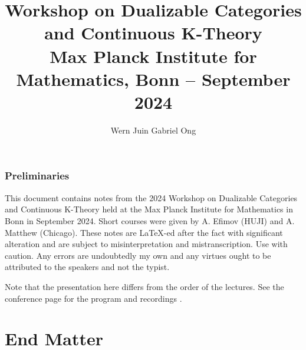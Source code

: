 \documentclass{amsart}
\theoremstyle{definition}
\numberwithin{equation}{section}
\begin{document}
\large
\title[Dualizable Categories and Continuous K-Theory -- MPIM 2024]{Workshop on Dualizable Categories and Continuous K-Theory \\ Max Planck Institute for Mathematics, Bonn -- September 2024}
\author{Wern Juin Gabriel Ong}
\address{Universit\"{a}t Bonn, Bonn, D-53111}
\maketitle
\section*{Preliminaries}
This document contains notes from the 2024 Workshop on Dualizable Categories and Continuous K-Theory held at the Max Planck Institute for Mathematics in Bonn in September 2024. Short courses were given by A. Efimov (HUJI) and A. Matthew (Chicago). These notes are \LaTeX-ed after the fact with significant alteration and are subject to misinterpretation and mistranscription. Use with caution. Any errors are undoubtedly my own and any virtues ought to be attributed to the speakers and not the typist. 

Note that the presentation here differs from the order of the lectures. See the conference page for the program and recordings \cite{DualizableBonn}.
\tableofcontents
\newpage










%
\part*{End Matter}
\printbibliography
\end{document}
